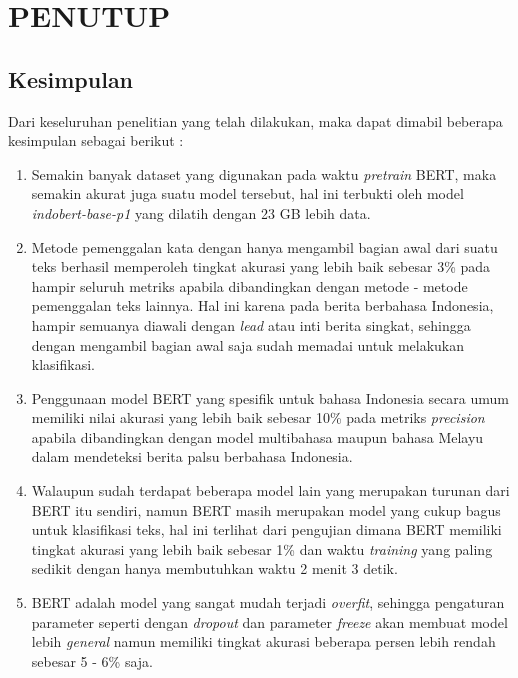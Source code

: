 \chapter{PENUTUP}
\label{chap:penutup}


\section{Kesimpulan}
\label{sec:kesimpulan}

Dari keseluruhan penelitian yang telah dilakukan, maka dapat dimabil beberapa kesimpulan sebagai berikut :

\begin{enumerate}[nolistsep]

  \item Semakin banyak dataset yang digunakan pada waktu \textit{pretrain} BERT, maka semakin akurat juga suatu model tersebut, hal ini terbukti oleh model \textit{indobert-base-p1} yang dilatih dengan 23 GB lebih data.
  \item Metode pemenggalan kata dengan hanya mengambil bagian awal dari suatu teks berhasil memperoleh tingkat akurasi yang lebih baik sebesar 3\% pada hampir seluruh metriks apabila dibandingkan dengan metode - metode pemenggalan teks lainnya. Hal ini karena pada berita berbahasa Indonesia, hampir semuanya diawali dengan \textit{lead} atau inti berita singkat, sehingga dengan mengambil bagian awal saja sudah memadai untuk melakukan klasifikasi.
  \item Penggunaan model BERT yang spesifik untuk bahasa Indonesia secara umum memiliki nilai akurasi yang lebih baik sebesar 10\% pada metriks \textit{precision} apabila dibandingkan dengan model multibahasa maupun bahasa Melayu dalam mendeteksi berita palsu berbahasa Indonesia.
  \item Walaupun sudah terdapat beberapa model lain yang merupakan turunan dari BERT itu sendiri, namun BERT masih merupakan model yang cukup bagus untuk klasifikasi teks, hal ini terlihat dari pengujian dimana BERT memiliki tingkat akurasi yang lebih baik sebesar 1\% dan waktu \textit{training} yang paling sedikit dengan hanya membutuhkan waktu 2 menit 3 detik.
  \item BERT adalah model yang sangat mudah terjadi \textit{overfit}, sehingga pengaturan parameter seperti dengan \textit{dropout} dan parameter \textit{freeze} akan membuat model lebih \textit{general} namun memiliki tingkat akurasi beberapa persen lebih rendah sebesar 5 - 6\% saja.

\end{enumerate}

